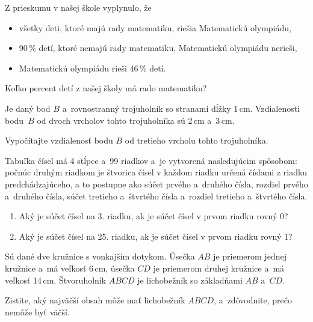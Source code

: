 {%
Z prieskumu v našej škole vyplynulo, že
\begin{itemize}
\item všetky deti, ktoré majú rady matematiku, riešia Matematickú olympiádu,
\item 90\,\% detí, ktoré nemajú rady matematiku, Matematickú olympiádu nerieši,
\item Matematickú olympiádu rieši 46\,\% detí.
\end{itemize}
Koľko percent detí z našej školy má rado matematiku?}

{%
Je daný bod $B$ a~rovnostranný trojuholník so stranami dĺžky 1\,cm.
Vzdialenosti bodu~$B$ od dvoch vrcholov tohto trojuholníka sú 2\,cm a~3\,cm.

Vypočítajte vzdialenosť bodu $B$ od tretieho vrcholu tohto trojuholníka.}

{%
Tabuľka čísel má 4 stĺpce a~99 riadkov
a~je vytvorená nasledujúcim spôsobom: počnúc druhým riadkom je štvorica čísel v každom riadku určená
číslami z riadku predchádzajúceho, a to postupne ako
súčet prvého a~druhého čísla, rozdiel prvého a~druhého čísla, súčet tretieho a~štvrtého čísla a~rozdiel tretieho a~štvrtého čísla.
\begin{enumerate} \alphatrue
\item Aký je súčet čísel na 3. riadku, ak je súčet čísel v prvom riadku rovný 0?
\item Aký je súčet čísel na 25. riadku, ak je súčet čísel v prvom riadku rovný 1?
\end{enumerate}
}

{%
Sú dané dve kružnice s vonkajším dotykom.
Úsečka $AB$ je priemerom jednej kružnice a~má veľkosť 6\,cm, úsečka $CD$ je priemerom druhej kružnice a~má veľkosť 14\,cm.
Štvoruholník $ABCD$ je lichobežník so základňami $AB$ a~$CD$.

Zistite, aký najväčší obsah môže mať lichobežník $ABCD$, a~zdôvodnite, prečo nemôže byť väčší.
%
}

